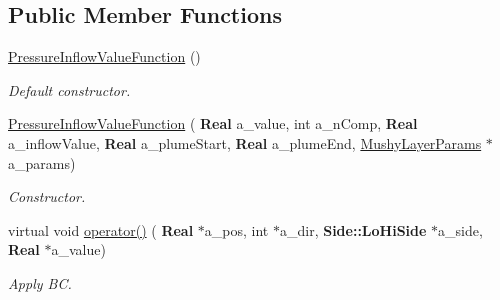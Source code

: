 \subsection*{Public Member Functions}
\begin{DoxyCompactItemize}
\item 
\mbox{\label{class_pressure_inflow_value_function_aafa131789b607de20fefcca422d6795c}} 
\hyperlink{class_pressure_inflow_value_function_aafa131789b607de20fefcca422d6795c}{Pressure\+Inflow\+Value\+Function} ()
\begin{DoxyCompactList}\small\item\em Default constructor. \end{DoxyCompactList}\item 
\mbox{\label{class_pressure_inflow_value_function_a2907075ed6815d19bb140409dd79f5b5}} 
\hyperlink{class_pressure_inflow_value_function_a2907075ed6815d19bb140409dd79f5b5}{Pressure\+Inflow\+Value\+Function} (\textbf{ Real} a\+\_\+value, int a\+\_\+n\+Comp, \textbf{ Real} a\+\_\+inflow\+Value, \textbf{ Real} a\+\_\+plume\+Start, \textbf{ Real} a\+\_\+plume\+End, \hyperlink{class_mushy_layer_params}{Mushy\+Layer\+Params} $\ast$a\+\_\+params)
\begin{DoxyCompactList}\small\item\em Constructor. \end{DoxyCompactList}\item 
\mbox{\label{class_pressure_inflow_value_function_ae700fea713b189f7b4ce066290f8b14e}} 
virtual void \hyperlink{class_pressure_inflow_value_function_ae700fea713b189f7b4ce066290f8b14e}{operator()} (\textbf{ Real} $\ast$a\+\_\+pos, int $\ast$a\+\_\+dir, \textbf{ Side\+::\+Lo\+Hi\+Side} $\ast$a\+\_\+side, \textbf{ Real} $\ast$a\+\_\+value)
\begin{DoxyCompactList}\small\item\em Apply BC. \end{DoxyCompactList}\end{DoxyCompactItemize}

